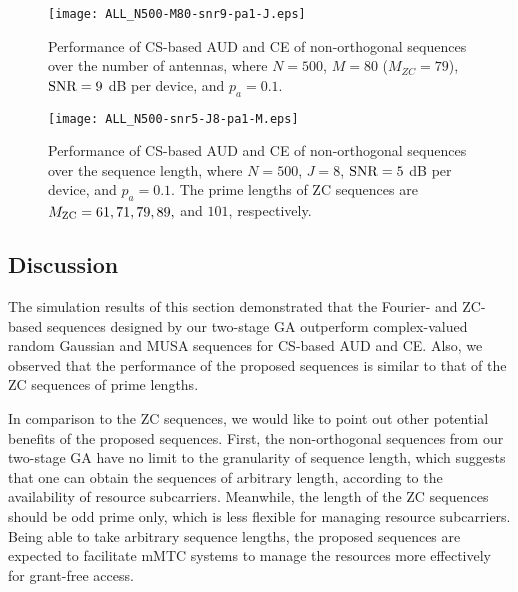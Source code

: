 \documentclass[journal]{IEEEtran}
\numberwithin{const2}{const}
\begin{document}
\begin{figure}[!t]
	\centering
	\texttt{[image: ALL\_N500-M80-snr9-pa1-J.eps]}
	\caption{Performance of CS-based AUD and CE of non-orthogonal sequences over the number of antennas, 
		where $N=500$, $M=80$ ($M_{ZC} = 79$), ${\rm SNR} = 9$ dB per device, and $p_a = 0.1$.}
	\label{fig:all_J}
\end{figure}

\begin{figure}[!t]
	\centering
	\texttt{[image: ALL\_N500-snr5-J8-pa1-M.eps]}
	\caption{Performance of CS-based AUD and CE of non-orthogonal sequences over the sequence length, 
		where $N=500$, $J=8$, ${\rm SNR} = 5$ dB per device, and $p_a = 0.1$. The prime lengths of ZC sequences are 
		$M_{\rm ZC} = 61, 71, 79, 89,$ and $101$, respectively.}
	\label{fig:all_M}
\end{figure}


\subsection{Discussion}
The simulation results of this section demonstrated that the Fourier- and ZC-based sequences
designed by our two-stage GA outperform complex-valued random Gaussian and MUSA sequences
for CS-based AUD and CE. %
Also, we observed that the performance of the proposed sequences is similar to that of   
the ZC sequences of prime lengths. 

In comparison to the ZC sequences, we would like to point out other potential
benefits of the proposed sequences.
First, the non-orthogonal sequences from our two-stage GA
have no limit to the granularity of sequence length, %
which suggests that 
one can obtain the sequences of arbitrary length, 
according to %
the availability of resource subcarriers.
Meanwhile, the length of the ZC sequences should be odd prime only,
which is less flexible for managing resource subcarriers. %
Being able to take arbitrary sequence lengths,
the proposed sequences are expected to
facilitate mMTC systems to manage the resources more effectively for grant-free access.
\end{document}
